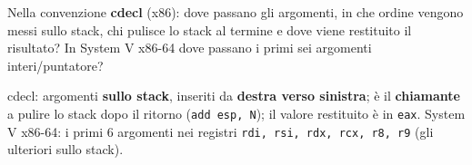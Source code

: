\question[5]
Nella convenzione \textbf{cdecl} (x86): dove passano gli argomenti, in che ordine vengono messi sullo stack, chi pulisce lo stack al termine e dove viene restituito il risultato?
In System V x86-64 dove passano i primi sei argomenti interi/puntatore?
\begin{solution}
cdecl: argomenti \textbf{sullo stack}, inseriti da \textbf{destra verso sinistra}; è il \textbf{chiamante} a pulire lo stack dopo il ritorno (\lstinline|add esp, N|); il valore restituito è in \lstinline|eax|.
System V x86-64: i primi 6 argomenti nei registri \lstinline|rdi, rsi, rdx, rcx, r8, r9| (gli ulteriori sullo stack).
\end{solution}

